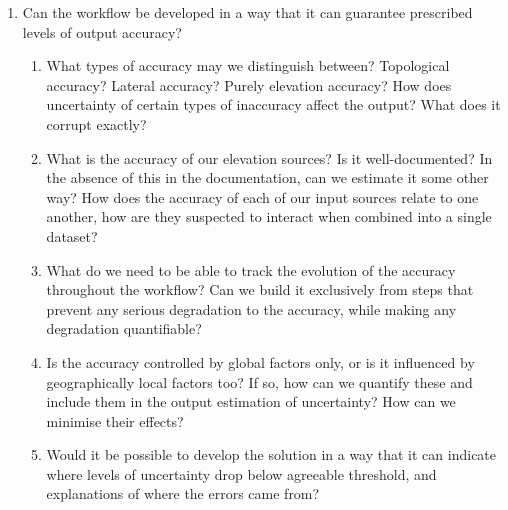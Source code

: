 \begin{enumerate}
\begin{enumerate}
    \end{enumerate}
    \item Can the workflow be developed in a way that it can guarantee prescribed levels of output accuracy?
    \begin{enumerate}
        \item What types of accuracy may we distinguish between? Topological accuracy? Lateral accuracy? Purely elevation accuracy? How does uncertainty of certain types of inaccuracy affect the output? What does it corrupt exactly?
        \item What is the accuracy of our elevation sources? Is it well-documented? In the absence of this in the documentation, can we estimate it some other way?
        \tiem How does the accuracy of each of our input sources relate to one another, how are they suspected to interact when combined into a single dataset?
        \item What do we need to be able to track the evolution of the accuracy throughout the workflow? Can we build it exclusively from steps that prevent any serious degradation to the accuracy, while making any degradation quantifiable?
        \item Is the accuracy controlled by global factors only, or is it influenced by geographically local factors too? If so, how can we quantify these and include them in the output estimation of uncertainty? How can we minimise their effects?
        \item Would it be possible to develop the solution in a way that it can indicate where levels of uncertainty drop below agreeable threshold, and explanations of where the errors came from?
    \end{enumerate}
\end{enumerate}